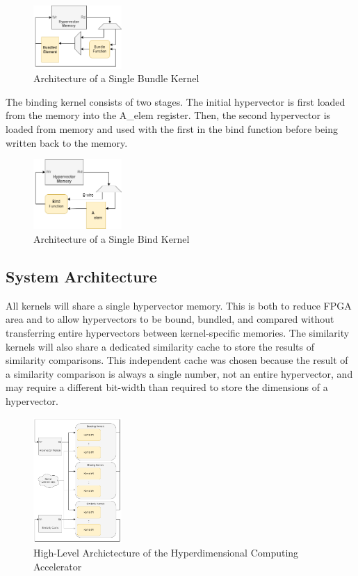 \documentclass[conference]{IEEEtran}
\begin{document}
\begin{figure}[H]
    \centering
    \includegraphics[width=0.3\textwidth]{img/kernel-bundle.png}
    \caption{Architecture of a Single Bundle Kernel}
    \label{fig:bundle-kernel}
\end{figure}

The binding kernel consists of two stages. The initial hypervector is first loaded from the memory into the A\_elem register. Then, the second hypervector is loaded from memory and used with the first in the bind function before being written back to the memory.

\begin{figure}[H]
    \centering
    \includegraphics[width=0.3\textwidth]{img/kernel-bind.png}
    \caption{Architecture of a Single Bind Kernel}
    \label{fig:bind-kernel}
\end{figure}

\subsection{System Architecture}

All kernels will share a single hypervector memory. This is both to reduce FPGA area and to allow hypervectors to be bound, bundled, and compared without transferring entire hypervectors between kernel-specific memories. The similarity kernels will also share a dedicated similarity cache to store the results of similarity comparisons. This independent cache was chosen because the result of a similarity comparison is always a single number, not an entire hypervector, and may require a different bit-width than required to store the dimensions of a hypervector.

\begin{figure}[H]
    \centering
    \includegraphics[width=0.3\textwidth]{img/system-level.png}
    \caption{High-Level Archictecture of the Hyperdimensional Computing Accelerator}
    \label{fig:system-level}
\end{figure}
\end{document}
